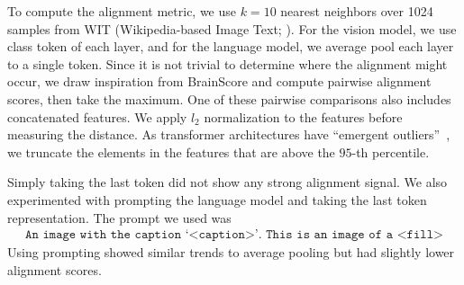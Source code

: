 To compute the alignment metric, we use $k=10$ nearest neighbors over 1024 samples from WIT (Wikipedia-based Image Text; \citet{srinivasan2021wit}). For the vision model, we use class token of each layer, and for the language model, we average pool each layer to a single token. Since it is not trivial to determine where the alignment might occur, we draw inspiration from BrainScore\cite{schrimpf2018brain} and compute pairwise alignment scores, then take the maximum. One of these pairwise comparisons also includes concatenated features. We apply $l_2$ normalization to the features before measuring the distance. As transformer architectures have ``emergent outliers''~\cite{dettmers2022gpt3}, we truncate the elements in the features that are above the $95$-th percentile.

Simply taking the last token did not show any strong alignment signal. We also experimented with prompting the language model and taking the last token representation. The prompt we used was 
\begin{align*}
    \texttt{An image with the caption `{<caption>}'. This is an image of a <fill>}
\end{align*}
Using prompting showed similar trends to average pooling but had slightly lower alignment scores.






